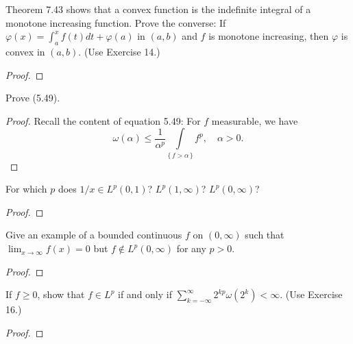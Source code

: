 \begin{problem}
Theorem 7.43 shows that a convex function is the indefinite integral of a
monotone increasing function. Prove the converse: If
$\varphi(x)=\int_a^xf(t)dt+\varphi(a)$ in $(a,b)$ and $f$ is monotone
increasing, then $\varphi$ is convex in $(a,b)$. (Use Exercise 14.)
\end{problem}
\begin{proof}
\end{proof}
\newpage

\begin{problem}
Prove (5.49).
\end{problem}
\begin{proof}
Recall the content of equation 5.49: For $f$ measurable, we have
\begin{equation}
  \label{eq:11:chebyshevs-inequality}
\omega(\alpha)\leq\frac{1}{\alpha^p}\int\limits_{\{\,f>\alpha\,\}}f^p,\quad\alpha>0.
\end{equation}
\end{proof}
\newpage

\begin{problem}
For which $p$ does $1/x\in L^p(0,1)$? $L^p(1,\infty)$? $L^p(0,\infty)$?
\end{problem}
\begin{proof}
\end{proof}
\newpage

\begin{problem}
Give an example of a bounded continuous $f$ on $(0,\infty)$ such that
$\lim_{x\to\infty}f(x)=0$ but $f\notin L^p(0,\infty)$ for any $p>0$.
\end{problem}
\begin{proof}
\end{proof}
\newpage

\begin{problem}
If $f\geq 0$, show that $f\in L^p$ if and only if $\sum_{k=-\infty}^\infty
2^{kp}\omega(2^k)<\infty$. (Use Exercise 16.)
\end{problem}
\begin{proof}
\end{proof}

